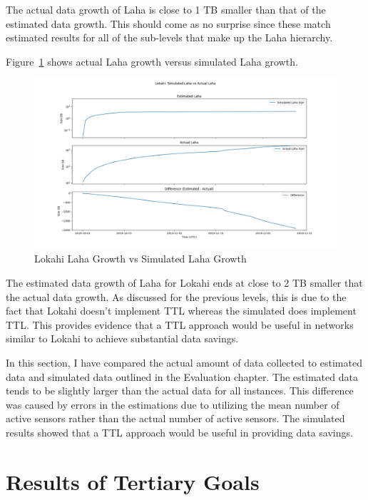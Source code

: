 The actual data growth of Laha is close to 1 TB smaller than that of the estimated data growth. This should come as no surprise since these match estimated results for all of the sub-levels that make up the Laha hierarchy.

Figure~\ref{fig:lokahi_actual_laha_vs_sim} shows actual Laha growth versus simulated Laha growth.

\begin{figure}[H]
    \centering
    \includegraphics[width=\linewidth]{figures/lokahi_actual_laha_vs_sim.png}
    \caption{Lokahi Laha Growth vs Simulated Laha Growth}
    \label{fig:lokahi_actual_laha_vs_sim}
\end{figure}

The estimated data growth of Laha for Lokahi ends at close to 2 TB smaller that the actual data growth. As discussed for the previous levels, this is due to the fact that Lokahi doesn't implement TTL whereas the simulated does implement TTL. This provides evidence that a TTL approach would be useful in networks similar to Lokahi to achieve substantial data savings.

In this section, I have compared the actual amount of data collected to estimated data and simulated data outlined in the Evaluation chapter. The estimated data tends to be slightly larger than the actual data for all instances. This difference was caused by errors in the estimations due to utilizing the mean number of active sensors rather than the actual number of active sensors. The simulated results showed that a TTL approach would be useful in providing data savings.

\section{Results of Tertiary Goals}\label{sec:results-of-tertiary-goals}

